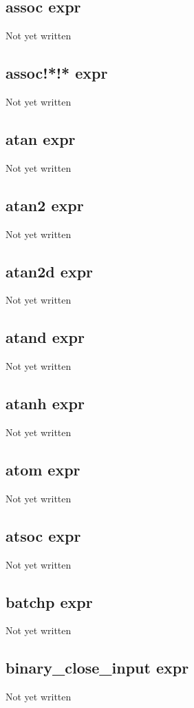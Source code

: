 \documentclass[a4paper,11pt]{article}
\begin{document}
\subsection{\ttfamily assoc expr}
Not yet written

\subsection{\ttfamily assoc!*!* expr}
Not yet written

\subsection{\ttfamily atan expr}
Not yet written

\subsection{\ttfamily atan2 expr}
Not yet written

\subsection{\ttfamily atan2d expr}
Not yet written

\subsection{\ttfamily atand expr}
Not yet written

\subsection{\ttfamily atanh expr}
Not yet written

\subsection{\ttfamily atom expr}
Not yet written

\subsection{\ttfamily atsoc expr}
Not yet written

\subsection{\ttfamily batchp expr}
Not yet written

\subsection{\ttfamily binary\_close\_input expr}
Not yet written
\end{document}
